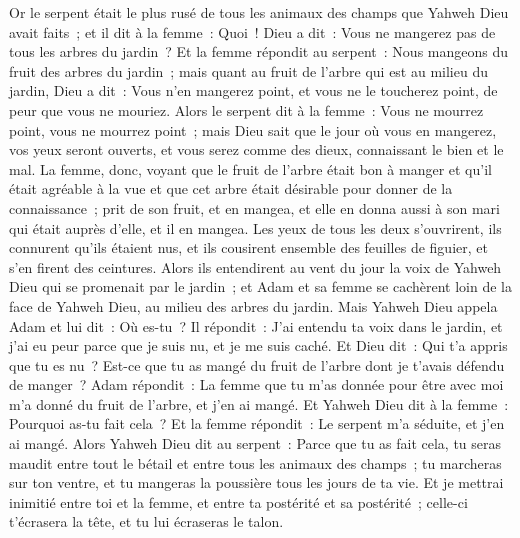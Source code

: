 \begin{multicols}{2}
\VerseOne{}Or le serpent était le plus rusé de tous les animaux des champs que Yahweh Dieu avait faits~; et il dit à la femme~: Quoi~! Dieu a dit~: Vous ne mangerez pas de tous les arbres du jardin~?
Et la femme répondit au serpent~: Nous mangeons du fruit des arbres du jardin~;
mais quant au fruit de l'arbre qui est au milieu du jardin, Dieu a dit~: Vous n'en mangerez point, et vous ne le toucherez point, de peur que vous ne mouriez.
Alors le serpent dit à la femme~: Vous ne mourrez point, vous ne mourrez point~;
mais Dieu sait que le jour où vous en mangerez, vos yeux seront ouverts, et vous serez comme des dieux, connaissant le bien et le mal.
La femme, donc, voyant que le fruit de l'arbre était bon à manger et qu'il était agréable à la vue et que cet arbre était désirable pour donner de la connaissance~; prit de son fruit, et en mangea, et elle en donna aussi à son mari qui était auprès d'elle, et il en mangea.
Les yeux de tous les deux s'ouvrirent, ils connurent qu'ils étaient nus, et ils cousirent ensemble des feuilles de figuier, et s'en firent des ceintures.
Alors ils entendirent au vent du jour la voix de Yahweh Dieu qui se promenait par le jardin~; et Adam et sa femme se cachèrent loin de la face de Yahweh Dieu, au milieu des arbres du jardin.
Mais Yahweh Dieu appela Adam et lui dit~: Où es-tu~?
Il répondit~: J'ai entendu ta voix dans le jardin, et j'ai eu peur parce que je suis nu, et je me suis caché.
Et Dieu dit~: Qui t'a appris que tu es nu~? Est-ce que tu as mangé du fruit de l'arbre dont je t'avais défendu de manger~?
Adam répondit~: La femme que tu m'as donnée pour être avec moi m'a donné du fruit de l'arbre, et j'en ai mangé.
Et Yahweh Dieu dit à la femme~: Pourquoi as-tu fait cela~? Et la femme répondit~: Le serpent m'a séduite, et j'en ai mangé.
Alors Yahweh Dieu dit au serpent~: Parce que tu as fait cela, tu seras maudit entre tout le bétail et entre tous les animaux des champs~; tu marcheras sur ton ventre, et tu mangeras la poussière tous les jours de ta vie.
Et je mettrai inimitié entre toi et la femme, et entre ta postérité et sa postérité~; celle-ci t'écrasera la tête, et tu lui écraseras le talon.

\end{multicols}
